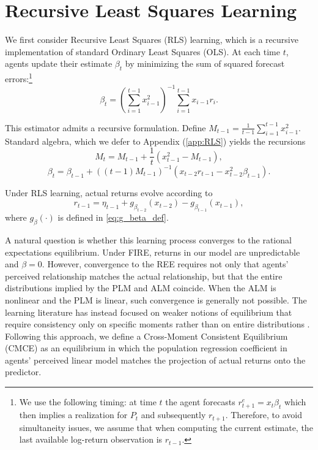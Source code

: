 \documentclass[11pt]{article}
\begin{document}
\section{Recursive Least Squares Learning}\label{sec:rec_ls}

We first consider Recursive Least Squares (RLS) learning, which is a recursive implementation of standard Ordinary Least Squares (OLS). At each time $t$, agents update their estimate $\beta_t$ by minimizing the sum of squared forecast errors:\footnote{We use the following timing: at time $t$ the agent forecasts $r^e_{t+1} = x_t \beta_t$ which then implies a realization for $P_t$ and subsequently $r_{t+1}$. Therefore, to avoid simultaneity issues, we assume that when computing the current estimate, the last available log-return observation is $r_{t-1}$.}
\begin{equation}
    \beta_t = \left(\sum^{t-1}_{i=1} x_{i-1}^2 \right)^{-1} \sum^{t-1}_{i=1} x_{i-1} r_i.
\end{equation}

This estimator admits a recursive formulation. Define $M_{t-1} = \frac{1}{t-1} \sum^{t-1}_{i=1} x_{i-1}^2$. Standard algebra, which we defer to Appendix (\ref{app:RLS}) yields the recursions
\begin{equation}
    M_t = M_{t-1} + \frac{1}{t} \left(x_{t-1}^2 - M_{t-1} \right),
\end{equation}
\begin{equation}
    \beta_t = \beta_{t-1} + \left((t-1) M_{t-1} \right)^{-1} \left( x_{t-2} r_{t-1} - x_{t-2}^2 \beta_{t-1} \right).
\end{equation}

Under RLS learning, actual returns evolve according to
\begin{equation}\label{eq:alm_RLS}
    r_{t-1} = \eta_{t-1}
    + g_{\beta_{t-2}}(x_{t-2}) - g_{\beta_{t-1}}(x_{t-1}),
\end{equation}
where $g_\beta(\cdot)$ is defined in \eqref{eq:g_beta_def}.

A natural question is whether this learning process converges to the rational expectations equilibrium. 
Under FIRE, returns in our model are unpredictable and $\beta = 0$. 
However, convergence to the REE requires not only that agents' perceived relationship matches the actual relationship, but that the entire distributions implied by the PLM and ALM coincide. 
When the ALM is nonlinear and the PLM is linear, such convergence is generally not possible. 
The learning literature has instead focused on weaker notions of equilibrium that require consistency only on specific moments rather than on entire distributions \citep{Hommes2014}. 
Following this approach, we define a Cross-Moment Consistent Equilibrium (CMCE) as an equilibrium in which the population regression coefficient in agents' perceived linear model matches the projection of actual returns onto the predictor.
\end{document}
